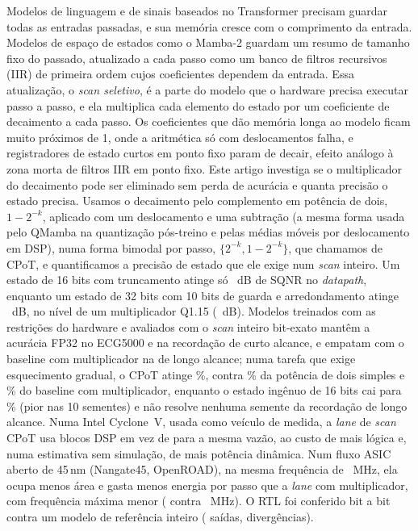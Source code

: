 \documentclass[12pt]{article}
\begin{document}
\begin{resumo}
Modelos de linguagem e de sinais baseados no Transformer precisam guardar todas as entradas passadas, e sua memória cresce com o comprimento da entrada. Modelos de espaço de estados como o Mamba-2 guardam um resumo de tamanho fixo do passado, atualizado a cada passo como um banco de filtros recursivos (IIR) de primeira ordem cujos coeficientes dependem da entrada. Essa atualização, o \emph{scan seletivo}, é a parte do modelo que o hardware precisa executar passo a passo, e ela multiplica cada elemento do estado por um coeficiente de decaimento a cada passo. Os coeficientes que dão memória longa ao modelo ficam muito próximos de 1, onde a aritmética só com deslocamentos falha, e registradores de estado curtos em ponto fixo param de decair, efeito análogo à zona morta de filtros IIR em ponto fixo. Este artigo investiga se o multiplicador do decaimento pode ser eliminado sem perda de acurácia e quanta precisão o estado precisa. Usamos o decaimento pelo complemento em potência de dois, $1-2^{-k}$, aplicado com um deslocamento e uma subtração (a mesma forma usada pelo QMamba na quantização pós-treino e pelas médias móveis por deslocamento em DSP), numa forma bimodal por passo, $\{2^{-k}, 1-2^{-k}\}$, que chamamos de CPoT, e quantificamos a precisão de estado que ele exige num \emph{scan} inteiro. Um estado de 16 bits com truncamento atinge só \SqnrLegacy~dB de SQNR no \emph{datapath}, enquanto um estado de 32 bits com 10 bits de guarda e arredondamento atinge \SqnrProposed~dB, no nível de um multiplicador Q1.15 (\SqnrMult~dB). Modelos treinados com as restrições do hardware e avaliados com o \emph{scan} inteiro bit-exato mantêm a acurácia FP32 no ECG5000 e na recordação de curto alcance, e empatam com o baseline com multiplicador na de longo alcance; numa tarefa que exige esquecimento gradual, o CPoT atinge \%, contra \% da potência de dois simples e \% do baseline com multiplicador, enquanto o estado ingênuo de 16 bits cai para \% (pior nas 10 sementes) e não resolve nenhuma semente da recordação de longo alcance. Numa Intel Cyclone~V, usada como veículo de medida, a \emph{lane} de \emph{scan} CPoT usa \DspCpot{} blocos DSP em vez de \DspMult{} para a mesma vazão, ao custo de mais lógica e, numa estimativa sem simulação, de mais potência dinâmica. Num fluxo ASIC aberto de 45\,nm (Nangate45, OpenROAD), na mesma frequência de \AsicIsoMhz~MHz, ela ocupa \AsicAreaSaving{} menos área e gasta \AsicEnergySaving{} menos energia por passo que a \emph{lane} com multiplicador, com frequência máxima menor (\AsicFmaxCpot{} contra \AsicFmaxMult~MHz). O RTL foi conferido bit a bit contra um modelo de referência inteiro (\VerTotal{} saídas, \VerMism{} divergências).
\end{resumo}
\end{document}
